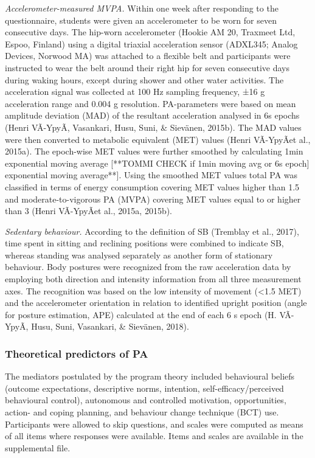 \documentclass[english,floatsintext,]{apa6}
\theoremstyle{definition}
\theoremstyle{definition}
\theoremstyle{definition}
\theoremstyle{remark}
\begin{document}
\emph{Accelerometer-measured MVPA.} Within one week after responding to
the questionnaire, students were given an accelerometer to be worn for
seven consecutive days. The hip-worn accelerometer (Hookie AM 20,
Traxmeet Ltd, Espoo, Finland) using a digital triaxial acceleration
sensor (ADXL345; Analog Devices, Norwood MA) was attached to a flexible
belt and participants were instructed to wear the belt around their
right hip for seven consecutive days during waking hours, except during
shower and other water activities. The acceleration signal was collected
at 100 Hz sampling frequency, ±16 g acceleration range and 0.004 g
resolution. PA-parameters were based on mean amplitude deviation (MAD)
of the resultant acceleration analysed in 6s epochs (Henri
VÃ\textcurrency-YpyÃ\textcurrency, Vasankari, Husu, Suni,
\& Sievänen, 2015b). The MAD values were then converted to metabolic
equivalent (MET) values (Henri
VÃ\textcurrency-YpyÃ\textcurrency et al., 2015a). The
epoch-wise MET values were further smoothed by calculating 1min
exponential moving average {[}**TOMMI CHECK if 1min moving avg or 6s
epoch{]} exponential moving average**{]}. Using the smoothed MET values
total PA was classified in terms of energy consumption covering MET
values higher than 1.5 and moderate-to-vigorous PA (MVPA) covering MET
values equal to or higher than 3 (Henri
VÃ\textcurrency-YpyÃ\textcurrency et al., 2015a, 2015b).

\emph{Sedentary behaviour.} According to the definition of SB (Tremblay
et al., 2017), time spent in sitting and reclining positions were
combined to indicate SB, whereas standing was analysed separately as
another form of stationary behaviour. Body postures were recognized from
the raw acceleration data by employing both direction and intensity
information from all three measurement axes. The recognition was based
on the low intensity of movement (\textless{}1.5 MET) and the
accelerometer orientation in relation to identified upright position
(angle for posture estimation, APE) calculated at the end of each 6 s
epoch (H. VÃ\textcurrency-YpyÃ\textcurrency, Husu, Suni,
Vasankari, \& Sievänen, 2018).

\subsubsection{Theoretical predictors of
PA}\label{theoretical-predictors-of-pa}

The mediators postulated by the program theory included behavioural
beliefs (outcome expectations, descriptive norms, intention,
self-efficacy/perceived behavioural control), autonomous and controlled
motivation, opportunities, action- and coping planning, and behaviour
change technique (BCT) use. Participants were allowed to skip questions,
and scales were computed as means of all items where responses were
available. Items and scales are available in the supplemental file.
\end{document}
